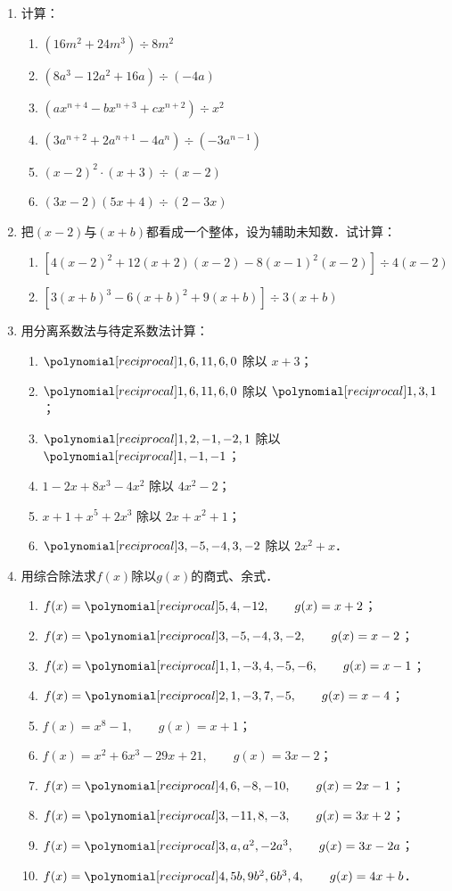 \begin{enumerate}
    \item 计算：
\begin{enumerate}
    \item $(16m^2+24m^3)\div 8m^2$
    \item $(8a^3-12a^2+16a)\div (-4a)$
    \item $(ax^{n+4}-bx^{n+3}+cx^{n+2})\div x^2$
    \item $(3a^{n+2}+2a^{n+1}-4a^n)\div (-3a^{n-1})$
\item $(x-2)^2 \cdot (x+3)\div (x-2)$
\item $(3x-2)(5x+4)\div (2-3x)$
\end{enumerate}

\item 把$(x-2)$与$(x+b)$都看成一个整体，设为辅助未知数．试计算：
\begin{enumerate}
    \item $\left[4(x-2)^2+12(x+2)(x-2)-8(x-1)^2(x-2)\right]\div 4(x-2)$
    \item $\left[3(x+b)^3-6(x+b)^2+9(x+b)\right]\div 3(x+b)$
\end{enumerate}

\item 用分离系数法与待定系数法计算：

\begin{enumerate}
    \item $\poly{1,6,11,6,0}$ 除以 $x+3$；
    \item $\poly{1,6,11,6,0}$ 除以 $\poly{1,3,1}$；
    \item $\poly{1,2,-1,-2,1}$ 除以 $\poly{1,-1,-1}$；
    \item $1-2x+8x^3-4x^2$ 除以 $4x^2-2$；
    \item $x+1+x^5+2x^3$ 除以 $2x+x^2+1$；
    \item $\poly{3,-5,-4,3,-2}$ 除以 $2x^2+x$．
\end{enumerate}

\item 用综合除法求$f(x)$除以$g(x)$的商式、余式．

\begin{enumerate}
    \item $f(x)=\poly{5,4,-12},\qquad g(x)=x+2$；
    \item $f(x)=\poly{3,-5,-4,3,-2},\qquad g(x)=x-2$；
    \item $f(x)=\poly{1,1,-3,4,-5,-6},\qquad g(x)=x-1$；
    \item $f(x)=\poly{2,1,-3,7,-5},\qquad g(x)=x-4$；
    \item $f(x)=x^8-1,\qquad g(x)=x+1$；
    \item $f(x)=x^2+6x^3-29x+21,\qquad g(x)=3x-2$；
    \item $f(x)=\poly{4,6,-8,-10},\qquad g(x)=2x-1$；
    \item $f(x)=\poly{3,-11,8,-3},\qquad g(x)=3x+2$；
    \item $f(x)=\poly{3,a,a^2,-2a^3},\qquad g(x)=3x-2a$；
    \item $f(x)=\poly{4,5b,9b^2,6b^3,4},\qquad g(x)=4x+b$．
\end{enumerate}


\end{enumerate}
